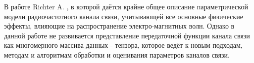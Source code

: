 \begin{comment}
При использовании пакета \verb!biblatex! будут подсчитаны все работы, добавленные
в файл \verb!biblio/author.bib!. Для правильного подсчёта работ в~различных
системах цитирования требуется использовать поля:
\begin{itemize}
\item \texttt{authorvak} если публикация индексирована ВАК,
\item \texttt{authorscopus} если публикация индексирована Scopus,
\item \texttt{authorwos} если публикация индексирована Web of Science,
\item \texttt{authorconf} для докладов конференций,
\item \texttt{authorother} для других публикаций.
\end{itemize}
Для подсчёта используются счётчики:
\begin{itemize}
\item \texttt{citeauthorvak} для работ, индексируемых ВАК,
\item \texttt{citeauthorscopus} для работ, индексируемых Scopus,
\item \texttt{citeauthorwos} для работ, индексируемых Web of Science,
\item \texttt{citeauthorvakscopuswos} для работ, индексируемых одной из трёх баз,
\item \texttt{citeauthorscopuswos} для работ, индексируемых Scopus или Web of~Science,
\item \texttt{citeauthorconf} для докладов на конференциях,
\item \texttt{citeauthorother} для остальных работ,
\item \texttt{citeauthor} для суммарного количества работ.
\end{itemize}

Для добавления в список публикаций автора работ, которые не были процитированы в
автореферате требуется их~перечислить с использованием команды \verb!\nocite! в
\verb!Synopsis/content.tex!.

\end{comment}

{\progress} В работе Richter A. \cite{Richter2005}, в которой даётся крайне общее описание параметрической модели радиочастотного канала связи, учитывающей все основные физические эффекты, влияющие на распространение электро-магнитных волн. Однако в данной работе не развивается представление передаточной функции канала связи как многомерного массива данных - тензора, которое ведёт к новым подходам, методам и алгоритмам обработки и оценивания параметров каналов связи.

